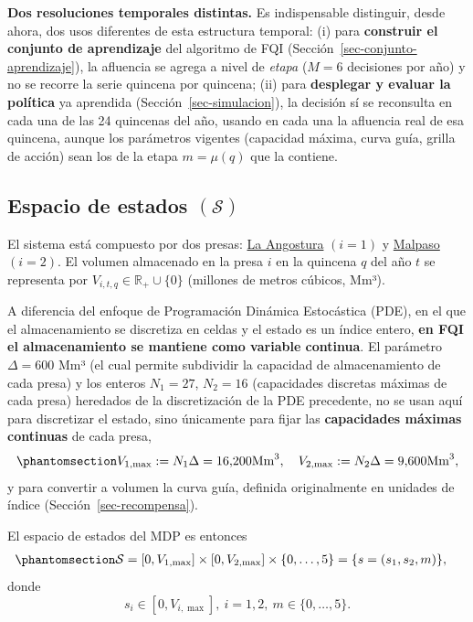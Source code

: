 \documentclass[
  spanish,
  letterpaper,
]{scrreprt}
\theoremstyle{definition}
\theoremstyle{remark}
\begin{document}
\textbf{Dos resoluciones temporales distintas.} Es indispensable
distinguir, desde ahora, dos usos diferentes de esta estructura
temporal: (i) para \textbf{construir el conjunto de aprendizaje} del
algoritmo de FQI (Sección~\ref{sec-conjunto-aprendizaje}), la afluencia
se agrega a nivel de \emph{etapa} (\(M=6\) decisiones por año) y no se
recorre la serie quincena por quincena; (ii) para \textbf{desplegar y
evaluar la política} ya aprendida (Sección~\ref{sec-simulacion}), la
decisión sí se reconsulta en cada una de las 24 quincenas del año,
usando en cada una la afluencia real de esa quincena, aunque los
parámetros vigentes (capacidad máxima, curva guía, grilla de acción)
sean los de la etapa \(m=\mu(q)\) que la contiene.

\subsection{\texorpdfstring{Espacio de estados
\((\mathcal{S})\)}{Espacio de estados (\textbackslash mathcal\{S\})}}\label{sec-espacio-estados}

El sistema está compuesto por dos presas:
\href{https://maps.app.goo.gl/NHNQdHdfYAoRGxhPA}{La Angostura}
\((i = 1)\) y \href{https://maps.app.goo.gl/acX7hVXswX5uYYUBA}{Malpaso}
\((i =2)\). El volumen almacenado en la presa \(i\) en la quincena \(q\)
del año \(t\) se representa por
\(V_{i,t,q} \in \mathbb{R}_{+} \cup \{0\}\) (millones de metros cúbicos,
Mm³).

A diferencia del enfoque de Programación Dinámica Estocástica (PDE), en
el que el almacenamiento se discretiza en celdas y el estado es un
índice entero, \textbf{en FQI el almacenamiento se mantiene como
variable continua}. El parámetro \(\Delta = 600\) Mm³ (el cual permite
subdividir la capacidad de almacenamiento de cada presa) y los enteros
\(N_1 = 27\), \(N_2 = 16\) (capacidades discretas máximas de cada presa)
heredados de la discretización de la PDE precedente, no se usan aquí
para discretizar el estado, sino únicamente para fijar las
\textbf{capacidades máximas continuas} de cada presa,
\begin{equation}\protect\phantomsection\label{eq-capacidad-maxima}{V_{1,\max} := N_1 \Delta = 16{,}200  \text{Mm}^3, \quad V_{2,\max} := N_2 \Delta = 9{,}600 \text{Mm}^3,}\end{equation}
y para convertir a volumen la curva guía, definida originalmente en
unidades de índice (Sección~\ref{sec-recompensa}).

El espacio de estados del MDP es entonces
\begin{equation}\protect\phantomsection\label{eq-espacio-estados}{\begin{aligned}
\mathcal{S}
&= [0,V_{1,\max}]\times[0,V_{2,\max}]
   \times\{0,\dots,5\} = \{s=(s_1,s_2,m)\},
\end{aligned}}\end{equation} donde \[s_i\in[0,V_{i,\max}],\ i=1,2,\ 
m\in\{0,\dots,5\}.\]
\end{document}
